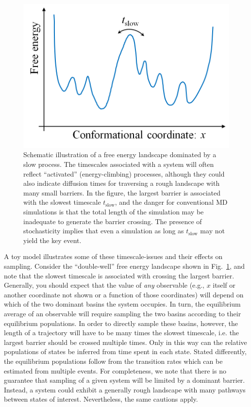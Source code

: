 


\begin{figure}
  \centering
  \includegraphics[width=0.9\linewidth]{figures/1d-landscape-tslow}
  \caption{
  \label{fig:landscape} 
  Schematic illustration of a free energy landscape dominated by a slow process.
  The timescales associated with a system will often reflect ``activated'' (energy-climbing) processes, although they could also indicate diffusion times for traversing a rough landscape with many small barriers.
  In the figure, the largest barrier is associated with the slowest timescale $t_{\mathrm{slow}}$, and the danger for conventional MD simulations is that the total length of the simulation may be inadequate to generate the barrier crossing.
  The presence of stochasticity implies that even a simulation as long as $t_{\mathrm{slow}}$ may not yield the key event.
  }
\end{figure}

A toy model illustrates some of these timescale-issues and their effects on sampling.
Consider the ``double-well'' free energy landscape shown in Fig.\ \ref{fig:landscape}, and note that the slowest timescale is associated with crossing the largest barrier.  Generally, you should expect that the value of \emph{any} observable (e.g., $x$ itself or another coordinate not shown or a function of those coordinates) will depend on which of the two dominant basins the system occupies.  In turn, the equilibrium average of an observable will require sampling the two basins according to their equilibrium populations.  In order to directly sample these basins, however, the length of a trajectory will have to be many times the slowest timescale, i.e. the largest barrier should be crossed multiple times.  Only in this way can the relative populations of states be inferred from time spent in each state.  Stated differently, the equilibrium populations follow from the transition rates \cite{Zuckerman2011,Chou11,Kolmogoroff1936} which can be estimated from multiple events.  For completeness, we note that there is no guarantee that sampling of a given system will be limited by a dominant barrier.  Instead, a system could exhibit a generally rough landscape with many pathways between states of interest.
Nevertheless, the same cautions apply.

